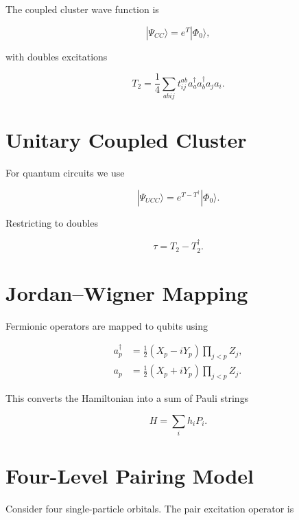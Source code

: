 \documentclass[twocolumn,superscriptaddress,unsortedaddress,nofootinbib,amsmath,amssymb,
aps,floatfix]{revtex4-2}
\begin{document}
The coupled cluster wave function is

\begin{equation}
|\Psi_{CC}\rangle = e^T|\Phi_0\rangle ,
\end{equation}

with doubles excitations

\begin{equation}
T_2 =
\frac{1}{4}
\sum_{abij}
t_{ij}^{ab}
a_a^\dagger a_b^\dagger a_j a_i .
\end{equation}

\section{Unitary Coupled Cluster}

For quantum circuits we use

\begin{equation}
|\Psi_{UCC}\rangle =
e^{T-T^\dagger}|\Phi_0\rangle .
\end{equation}

Restricting to doubles

\begin{equation}
\tau = T_2 - T_2^\dagger .
\end{equation}

\section{Jordan--Wigner Mapping}

Fermionic operators are mapped to qubits using

\begin{align}
a_p^\dagger &= 
\frac{1}{2}(X_p-iY_p)\prod_{j<p}Z_j , \\
a_p &= 
\frac{1}{2}(X_p+iY_p)\prod_{j<p}Z_j .
\end{align}

This converts the Hamiltonian into a sum of Pauli strings

\begin{equation}
H = \sum_i h_i P_i .
\end{equation}

\section{Four-Level Pairing Model}

Consider four single-particle orbitals.
The pair excitation operator is
\end{document}
